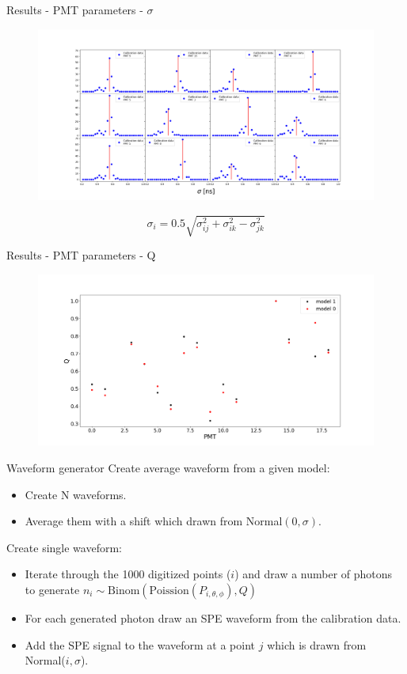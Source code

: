 \documentclass{beamer}
\begin{document}
\begin{frame}{Results - PMT parameters - $\sigma$}
\begin{figure}[h]
  \includegraphics[width=\linewidth]{delay.png}
\end{figure}
\begin{equation}
\sigma_i=0.5\sqrt{\sigma_{ij}^2+\sigma^2_{ik}-\sigma^2_{jk}}
\end{equation}
\end{frame}

\begin{frame}{Results - PMT parameters - Q}
	\begin{figure}[h]
  \includegraphics[width=\linewidth]{Q.png}
\end{figure}
\end{frame}

\begin{frame}{Waveform generator}
Create average waveform from a given model:
\begin{itemize}
\item Create N waveforms.
\item Average them with a shift which drawn from Normal$(0,\sigma)$.
\end{itemize}
Create single waveform:
\begin{itemize}
\item Iterate through the 1000 digitized points ($i$) and draw a number of photons to generate $n_i\sim \text{Binom}(\text{Poission}(P_{i,\theta,\phi}), Q)$ 
\item For each generated photon draw an SPE waveform from the calibration data.
\item Add the SPE signal to the waveform at a point $j$ which is drawn from Normal($i,\sigma$).
\end{itemize}
\end{frame}
\end{document}
